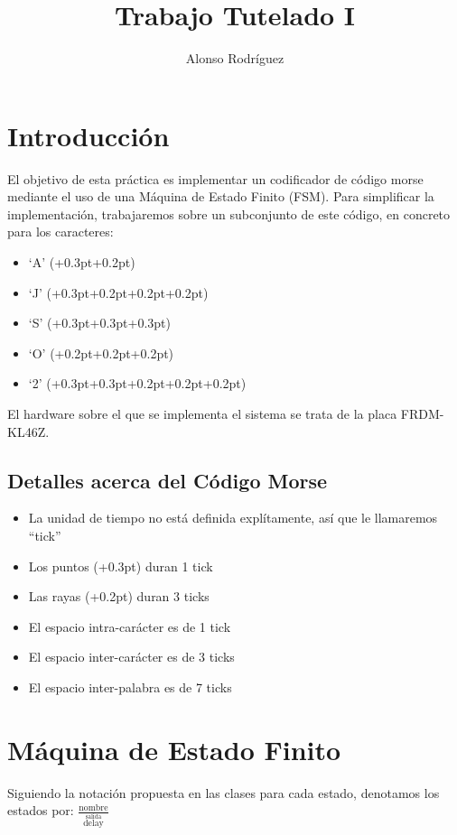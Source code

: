 \documentclass[a4paper,openright,12pt]{article}
\newcommand{\punto}{\kern+0.3pt\raisebox{0.35ex}{\huge\textbf.}}
\newcommand{\raya}{\kern+0.2pt\raisebox{-0.35ex}{\huge\textbf-}}
\begin{document}
\author {Alonso Rodríguez}
\title {Trabajo Tutelado I}

\maketitle

\justifying{}

\section{Introducción}
El objetivo de esta práctica es implementar un codificador de código morse mediante el uso de una Máquina de Estado Finito (FSM).
Para simplificar la implementación, trabajaremos sobre un subconjunto de este código, en concreto para los caracteres:
\begin{itemize}
    \item `A' (\punto\raya)
    \item `J' (\punto\raya\raya\raya)
    \item `S' (\punto\punto\punto)
    \item `O' (\raya\raya\raya)
    \item `2' (\punto\punto\raya\raya\raya)
\end{itemize} 

El hardware sobre el que se implementa el sistema se trata de la placa FRDM-KL46Z.

\subsection{Detalles acerca del Código Morse}
\begin{itemize}
    \item La unidad de tiempo no está definida explítamente, así que le llamaremos ``tick''
    \item Los puntos (\punto) duran 1 tick
    \item Las rayas (\raya) duran 3 ticks
    \item El espacio intra-carácter es de 1 tick
    \item El espacio inter-carácter es de 3 ticks
    \item El espacio inter-palabra es de 7 ticks
\end{itemize}


\section{Máquina de Estado Finito}
Siguiendo la notación propuesta en las clases para cada estado, denotamos los estados por: $\frac{\text{nombre}}{\overset{\text{salida}}{\text{delay}}}$
\end{document}
